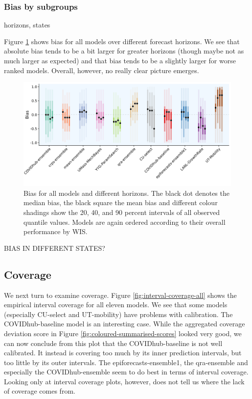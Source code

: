 \documentclass[
]{book}
\begin{document}
\hypertarget{bias-by-subgroups}{%
\subsubsection{Bias by subgroups}\label{bias-by-subgroups}}

horizons, states

Figure \ref{fig:bias-all} shows bias for all models over different forecast horizons. We see that absolute bias tends to be a bit larger for greater horizons (though maybe not as much larger as expected) and that bias tends to be a slightly larger for worse ranked models. Overall, however, no really clear picture emerges.

\begin{figure}
\includegraphics[width=1\linewidth]{../visualisation/chapter-5-results/bias-horizons} \caption{Bias for all models and different horizons. The black dot denotes the median bias, the black square the mean bias and different colour shadings show the 20, 40, and 90 percent intervals of all observed quantile values. Models are again ordered according to their overall performance by WIS.}\label{fig:bias-all}
\end{figure}

BIAS IN DIFFERENT STATES?

\hypertarget{coverage}{%
\subsection{Coverage}\label{coverage}}

We next turn to examine coverage. Figure \ref{fig:interval-coverage-all} shows the empirical interval coverage for all eleven models. We see that some models (especially CU-select and UT-mobility) have problems with calibration. The COVIDhub-baseline model is an interesting case. While the aggregated coverage deviation score in Figure \ref{fig:coloured-summarised-scores} looked very good, we can now conclude from this plot that the COVIDhub-baseline is not well calibrated. It instead is covering too much by its inner prediction intervals, but too little by its outer intervals. The epiforecasts-ensemble1, the qra-ensemble and especially the COVIDhub-ensemble seem to do best in terms of interval coverage. Looking only at interval coverage plots, however, does not tell us where the lack of coverage comes from.
\end{document}
